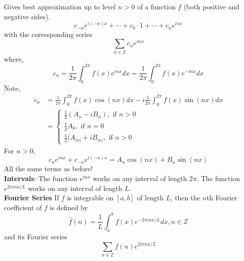 \documentclass[12pt]{article}
\begin{document}
\noindent Gives best approximation up to level $n>0$ of a function $f$ (both positive and negative sides). 
$$c_{-n} e^{i(-n)x} + \cdots + c_0 \cdot 1 + \cdots + c_n e^{inx}$$
with the corresponding series
$$\sum_{n\in \mathbb{Z}} c_n e^{inx} $$
where,
$$c_n = \frac{1}{2\pi} \int^{2\pi}_0 f(x) \overline{e^{inx}} dx = \frac{1}{2\pi} \int^{2\pi}_0 f(x) e^{-inx} dx$$
Note, 
\begin{align*}
c_n &= \frac{1}{2\pi} \int^{2\pi}_0 f(x) \cos(nx) dx - i\frac{1}{2\pi} \int^{2\pi}_0 f(x) \sin(nx) dx \\
&= \begin{cases}
\frac{1}{2}(A_n-iB_n), \text{ if } n > 0 \\
\frac{1}{2}A_0, \text{ if } n = 0 \\
\frac{1}{2}(A_{\vert n \vert} + i B_{\vert n \vert}, \text{ if } n >0
\end{cases}
\end{align*}
For $n>0$,
$$c_n e^{inx} + c_{-n} e^{i(-n)x} = A_n \cos(nx) + B_n \sin (nx)$$
All the same terms as before! \\

 
\noindent \textbf{Intervals}:
The function $e^{inx}$ works on any interval of length $2\pi$. 
The function $e^{2\pi inx / L}$ works on any interval of length $L$. \\

\noindent \textbf{Fourier Series}
If $f$ is integrable on $[a,b]$ of length $L$, then the $n$th Fourier coefficient of $f$ is defined by 
$$\hat{f}(n) = \frac{1}{L} \int^b_a f(x) e^{-2\pi inx / L} dx, n \in \mathbb{Z}$$
and its Fourier series
$$\sum_{n \in \mathbb{Z}} \hat{f}(n) e^{2\pi inx / L}$$
\end{document}

